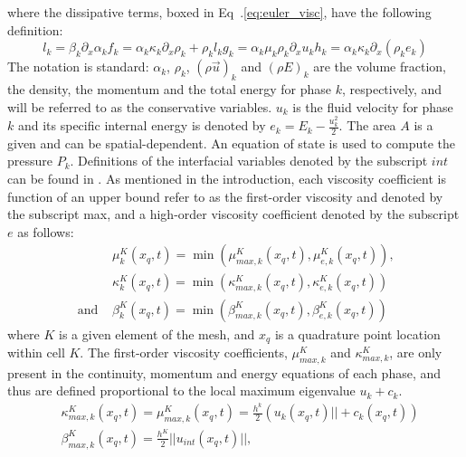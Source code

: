 \documentclass{anstrans}
\begin{document}
where the dissipative terms, boxed in Eq~.\ref{eq:euler_visc}, have the following definition:
\begin{subequations}
%
\begin{equation}
  l_k = \beta_k \partial_x \alpha_k 
\end{equation}
%  
\begin{equation}
  f_k = \alpha_k \kappa_k \partial_x \rho_k + \rho_k l_k 
\end{equation}
%  
\begin{equation}
  g_k = \alpha_k \mu_k \rho_k \partial_x u_k 
\end{equation}  
%
\begin{equation}
  h_k =  \alpha_k \kappa_k \partial_x \left( \rho_k e_k \right)
 \end{equation}
%
\end{subequations}
The notation is standard: $\alpha_k$, $\rho_k$, $(\rho \vec{u})_k$ and $(\rho E)_k$ are the volume fraction, the density, the momentum and the total energy for phase $k$, respectively, and will be referred to as the conservative variables. $u_k$ is the fluid velocity for phase $k$ and its specific internal energy is denoted by $e_k=E_k-\tfrac{u^2_k}{2}$. The area $A$ is a given and can be spatial-dependent. An equation of state is used to compute the pressure $P_k$. Definitions of the interfacial variables denoted by the subscript $int$ can be found in \cite{berry}. As mentioned in the introduction, each viscosity coefficient is function of an upper bound refer to as the first-order viscosity and denoted by the subscript max, and a high-order viscosity coefficient denoted by the subscript $e$ as follows: 
%
\begin{align}
&\mu_k^K(x_q,t) = \min ( \mu_{max,k}^K(x_q,t), \mu_{e,k}^K(x_q,t) ) \text{, } \nonumber \\
&\kappa_k^K(x_q,t) = \min ( \kappa_{max,k}^K(x_q,t), \kappa_{e,k}^K(x_q,t) )\nonumber  \\ 
\text{ and } &\beta_k^K(x_q,t) = \min ( \beta_{max,k}^K(x_q,t), \beta_{e,k}^K(x_q,t) ) \nonumber
\end{align}
%
where $K$ is a given element of the mesh, and $x_q$ is a quadrature point location within cell $K$.
The first-order viscosity coefficients, $\mu^K_{max,k}$ and $\kappa^K_{max,k}$, are only present in the continuity, momentum and energy equations of each phase, and thus are defined proportional to the local maximum eigenvalue $u_k + c_k$. 
%
\begin{align}
&\kappa_{max,k}^K(x_q,t) = \mu_{max,k}^K(x_q,t) = \frac{h^k}{2} (u_k(x_q,t) || +c_k(x_q,t) ) \nonumber \\
&\beta_{max,k}^K(x_q,t) = \frac{h^K}{2} ||u_{int}(x_q,t) ||, \nonumber
\end{align}
\end{document}
